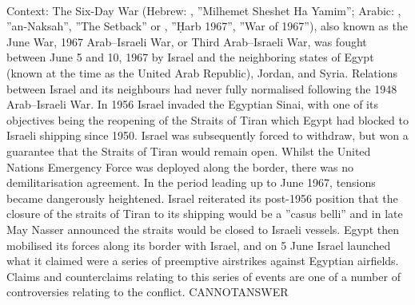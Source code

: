 \documentclass[11pt,a4paper, onecolumn]{article}
\begin{document}
\\ Context: The Six-Day War (Hebrew: , ''Milhemet Sheshet Ha Yamim''; Arabic: , ''an-Naksah'', ''The Setback'' or , ''Ḥarb 1967'', ''War of 1967''), also known as the June War, 1967 Arab–Israeli War, or Third Arab–Israeli War, was fought between June 5 and 10, 1967 by Israel and the neighboring states of Egypt (known at the time as the United Arab Republic), Jordan, and Syria. Relations between Israel and its neighbours had never fully normalised following the 1948 Arab–Israeli War. In 1956 Israel invaded the Egyptian Sinai, with one of its objectives being the reopening of the Straits of Tiran which Egypt had blocked to Israeli shipping since 1950. Israel was subsequently forced to withdraw, but won a guarantee that the Straits of Tiran would remain open. Whilst the United Nations Emergency Force was deployed along the border, there was no demilitarisation agreement. In the period leading up to June 1967, tensions became dangerously heightened. Israel reiterated its post-1956 position that the closure of the straits of Tiran to its shipping would be a ''casus belli'' and in late May Nasser announced the straits would be closed to Israeli vessels. Egypt then mobilised its forces along its border with Israel, and on 5 June Israel launched what it claimed were a series of preemptive airstrikes against Egyptian airfields. Claims and counterclaims relating to this series of events are one of a number of controversies relating to the conflict. CANNOTANSWER
\end{document}
